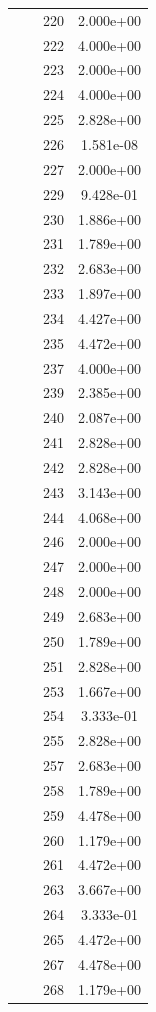 \documentclass[12pt]{article}
\begin{document}
\begin{longtable}{@{}cccc@{}}
 &  & 220 & 2.000e+00 \\
 &  & 222 & 4.000e+00 \\
 &  & 223 & 2.000e+00 \\
 &  & 224 & 4.000e+00 \\
 &  & 225 & 2.828e+00 \\
 &  & 226 & 1.581e-08 \\
 &  & 227 & 2.000e+00 \\
 &  & 229 & 9.428e-01 \\
 &  & 230 & 1.886e+00 \\
 &  & 231 & 1.789e+00 \\
 &  & 232 & 2.683e+00 \\
 &  & 233 & 1.897e+00 \\
 &  & 234 & 4.427e+00 \\
 &  & 235 & 4.472e+00 \\
 &  & 237 & 4.000e+00 \\
 &  & 239 & 2.385e+00 \\
 &  & 240 & 2.087e+00 \\
 &  & 241 & 2.828e+00 \\
 &  & 242 & 2.828e+00 \\
 &  & 243 & 3.143e+00 \\
 &  & 244 & 4.068e+00 \\
 &  & 246 & 2.000e+00 \\
 &  & 247 & 2.000e+00 \\
 &  & 248 & 2.000e+00 \\
 &  & 249 & 2.683e+00 \\
 &  & 250 & 1.789e+00 \\
 &  & 251 & 2.828e+00 \\
 &  & 253 & 1.667e+00 \\
 &  & 254 & 3.333e-01 \\
 &  & 255 & 2.828e+00 \\
 &  & 257 & 2.683e+00 \\
 &  & 258 & 1.789e+00 \\
 &  & 259 & 4.478e+00 \\
 &  & 260 & 1.179e+00 \\
 &  & 261 & 4.472e+00 \\
 &  & 263 & 3.667e+00 \\
 &  & 264 & 3.333e-01 \\
 &  & 265 & 4.472e+00 \\
 &  & 267 & 4.478e+00 \\
 &  & 268 & 1.179e+00 \\

\end{longtable}
\end{document}
